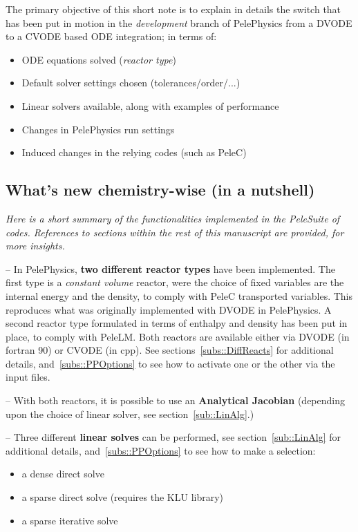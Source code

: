 \documentclass[12pt]{article}
\begin{document}
The primary objective of this short note is to explain in details the switch that has been put in motion in the \textit{development} branch of PelePhysics from a DVODE to a CVODE based ODE integration; in terms of:
\begin{itemize}
\item ODE equations solved (\textit{reactor type})
\item Default solver settings chosen (tolerances/order/...)
\item Linear solvers available, along with examples of performance
\item Changes in PelePhysics run settings
\item Induced changes in the relying codes (such as PeleC)
\end{itemize} 

\subsection{What's new chemistry-wise (in a nutshell)}
\label{subs::WD}

\textit{Here is a short summary of the functionalities implemented in the PeleSuite of codes. References to sections within the rest of this manuscript are provided, for more insights.}

-- In PelePhysics, \textbf{two different reactor types} have been implemented. The first type is a \textit{constant volume} reactor, were the choice of fixed variables are the internal energy and the density, to comply with PeleC transported variables. This reproduces what was originally implemented with DVODE in PelePhysics. A second reactor type formulated in terms of enthalpy and density has been put in place, to comply with PeleLM. Both reactors are available either via DVODE (in fortran 90) or CVODE (in cpp). See sections~\ref{subs::DiffReacts} for additional details, and~\ref{subs::PPOptions} to see how to activate one or the other via the input files.

-- With both reactors, it is possible to use an \textbf{Analytical Jacobian} (depending upon the choice of linear solver, see section~\ref{sub::LinAlg}.)

-- Three different \textbf{linear solves} can be performed, see section~\ref{sub::LinAlg} for additional details, and~\ref{subs::PPOptions} to see how to make a selection:
\begin{itemize}
\item a dense direct solve
\item a sparse direct solve (requires the KLU library)
\item a sparse iterative solve
\end{itemize} 
\end{document}
